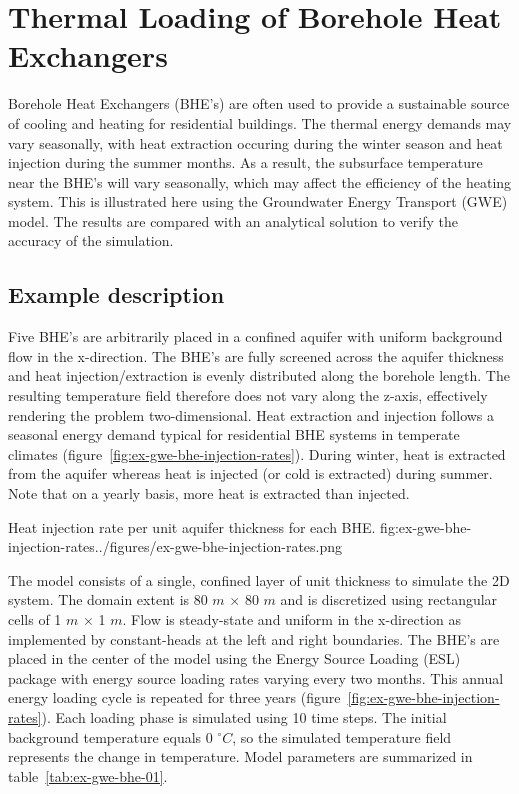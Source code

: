 \section{Thermal Loading of Borehole Heat Exchangers}

Borehole Heat Exchangers (BHE's) are often used to provide a sustainable source of cooling and heating for residential buildings. The thermal energy demands may vary seasonally, with heat extraction occuring during the winter season and heat injection during the summer months. As a result, the subsurface temperature near the BHE's will vary seasonally, which may affect the efficiency of the heating system. This is illustrated here using the Groundwater Energy Transport (GWE) model. The results are compared with an analytical solution to verify the accuracy of the \mf simulation. 

\subsection{Example description}

Five BHE's are arbitrarily placed in a confined aquifer with uniform background flow in the x-direction. The BHE's are fully screened across the aquifer thickness and heat injection/extraction is evenly distributed along the borehole length. The resulting temperature field therefore does not vary along the z-axis, effectively rendering the problem two-dimensional. Heat extraction and injection follows a seasonal energy demand typical for residential BHE systems in temperate climates (figure~\ref{fig:ex-gwe-bhe-injection-rates}). During winter, heat is extracted from the aquifer whereas heat is injected (or cold is extracted) during summer. Note that on a yearly basis, more heat is extracted than injected.

\begin{StandardFigure}{
    Heat injection rate per unit aquifer thickness for each BHE.
    }{fig:ex-gwe-bhe-injection-rates}{../figures/ex-gwe-bhe-injection-rates.png}
\end{StandardFigure}                                 

The \mf model consists of a single, confined layer of unit thickness to simulate the 2D system. The domain extent is 80 $m$ $\times$ 80 $m$ and is discretized using rectangular cells of 1 $m$ $\times$ 1 $m$. Flow is steady-state and uniform in the x-direction as implemented by constant-heads at the left and right boundaries. The BHE's are placed in the center of the model using the Energy Source Loading (ESL) package with energy source loading rates varying every two months. This annual energy loading cycle is repeated for three years (figure~\ref{fig:ex-gwe-bhe-injection-rates}). Each loading phase is simulated using 10 time steps. The initial background temperature equals 0 $^{\circ} C$, so the simulated temperature field represents the change in temperature. Model parameters are summarized in table~\ref{tab:ex-gwe-bhe-01}.

